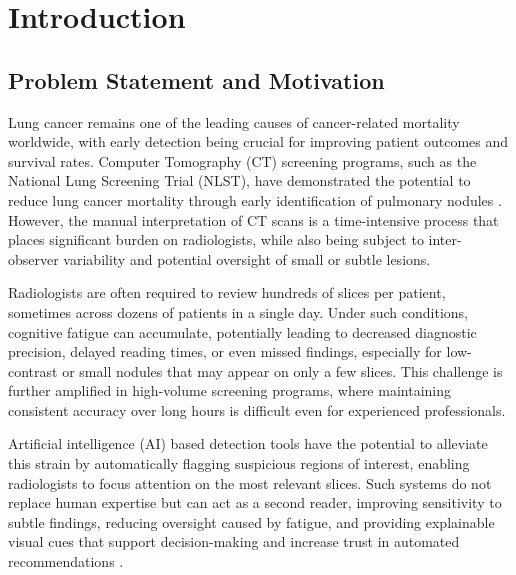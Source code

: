\chapter{Introduction}
\label{ch:introduction}

\section{Problem Statement and Motivation}

Lung cancer remains one of the leading causes of cancer-related mortality worldwide, with early detection being crucial for improving patient outcomes and survival rates. Computer Tomography (CT) screening programs, such as the National Lung Screening Trial (NLST), have demonstrated the potential to reduce lung cancer mortality through early identification of pulmonary nodules \cite{nlst_primary_paper}. However, the manual interpretation of CT scans is a time-intensive process that places significant burden on radiologists, while also being subject to inter-observer variability and potential oversight of small or subtle lesions.

Radiologists are often required to review hundreds of slices per patient, sometimes across dozens of patients in a single day. Under such conditions, cognitive fatigue can accumulate, potentially leading to decreased diagnostic precision, delayed reading times, or even missed findings, especially for low-contrast or small nodules that may appear on only a few slices. This challenge is further amplified in high-volume screening programs, where maintaining consistent accuracy over long hours is difficult even for experienced professionals.

Artificial intelligence (AI) based detection tools have the potential to alleviate this strain by automatically flagging suspicious regions of interest, enabling radiologists to focus attention on the most relevant slices. Such systems do not replace human expertise but can act as a second reader, improving sensitivity to subtle findings, reducing oversight caused by fatigue, and providing explainable visual cues that support decision-making and increase trust in automated recommendations \cite{glikson2020human}.


